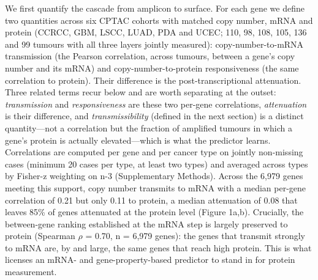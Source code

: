 \documentclass[times, twoside]{zHenriquesLab-StyleBioRxiv}
\begin{document}
We first quantify the cascade from amplicon to surface. For each gene we define two quantities across six CPTAC cohorts with matched copy number, mRNA and protein (CCRCC, GBM, LSCC, LUAD, PDA and UCEC; 110, 98, 108, 105, 136 and 99 tumours with all three layers jointly measured): copy-number-to-mRNA transmission (the Pearson correlation, across tumours, between a gene's copy number and its mRNA) and copy-number-to-protein responsiveness (the same correlation to protein). Their difference is the post-transcriptional attenuation. Three related terms recur below and are worth separating at the outset: \emph{transmission} and \emph{responsiveness} are these two per-gene correlations, \emph{attenuation} is their difference, and \emph{transmissibility} (defined in the next section) is a distinct quantity---not a correlation but the fraction of amplified tumours in which a gene's protein is actually elevated---which is what the predictor learns. Correlations are computed per gene and per cancer type on jointly non-missing cases (minimum 20 cases per type, at least two types) and averaged across types by Fisher-z weighting on n-3 (Supplementary Methods). Across the 6,979 genes meeting this support, copy number transmits to mRNA with a median per-gene correlation of 0.21 but only 0.11 to protein, a median attenuation of 0.08 that leaves 85\% of genes attenuated at the protein level (Figure 1a,b). Crucially, the between-gene ranking established at the mRNA step is largely preserved to protein (Spearman $\rho$ = 0.70, n = 6,979 genes): the genes that transmit strongly to mRNA are, by and large, the same genes that reach high protein. This is what licenses an mRNA- and gene-property-based predictor to stand in for protein measurement.
\end{document}
